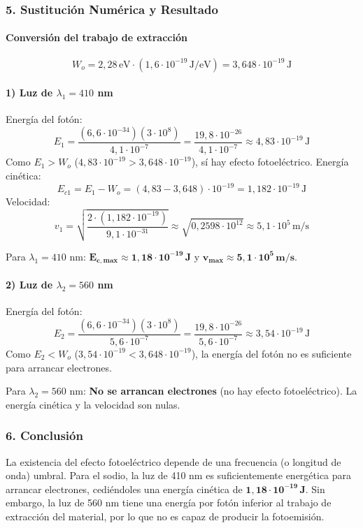 \subsubsection*{5. Sustitución Numérica y Resultado}
\paragraph{Conversión del trabajo de extracción}
$$ W_o = 2,28 \, \text{eV} \cdot (1,6 \cdot 10^{-19} \, \text{J/eV}) = 3,648 \cdot 10^{-19} \, \text{J} $$
\paragraph{1) Luz de $\lambda_1 = 410$ nm}
Energía del fotón:
$$ E_1 = \frac{(6,6 \cdot 10^{-34})(3 \cdot 10^8)}{4,1 \cdot 10^{-7}} = \frac{19,8 \cdot 10^{-26}}{4,1 \cdot 10^{-7}} \approx 4,83 \cdot 10^{-19} \, \text{J} $$
Como $E_1 > W_o$ ($4,83 \cdot 10^{-19} > 3,648 \cdot 10^{-19}$), sí hay efecto fotoeléctrico.
Energía cinética:
$$ E_{c1} = E_1 - W_o = (4,83 - 3,648) \cdot 10^{-19} = 1,182 \cdot 10^{-19} \, \text{J} $$
Velocidad:
$$ v_1 = \sqrt{\frac{2 \cdot (1,182 \cdot 10^{-19})}{9,1 \cdot 10^{-31}}} \approx \sqrt{0,2598 \cdot 10^{12}} \approx 5,1 \cdot 10^5 \, \text{m/s} $$
\begin{cajaresultado}
    Para $\lambda_1=410$ nm: $\boldsymbol{E_{c,max} \approx 1,18 \cdot 10^{-19} \, \textbf{J}}$ y $\boldsymbol{v_{max} \approx 5,1 \cdot 10^5 \, \textbf{m/s}}$.
\end{cajaresultado}

\paragraph{2) Luz de $\lambda_2 = 560$ nm}
Energía del fotón:
$$ E_2 = \frac{(6,6 \cdot 10^{-34})(3 \cdot 10^8)}{5,6 \cdot 10^{-7}} = \frac{19,8 \cdot 10^{-26}}{5,6 \cdot 10^{-7}} \approx 3,54 \cdot 10^{-19} \, \text{J} $$
Como $E_2 < W_o$ ($3,54 \cdot 10^{-19} < 3,648 \cdot 10^{-19}$), la energía del fotón no es suficiente para arrancar electrones.
\begin{cajaresultado}
    Para $\lambda_2=560$ nm: \textbf{No se arrancan electrones} (no hay efecto fotoeléctrico). La energía cinética y la velocidad son nulas.
\end{cajaresultado}

\subsubsection*{6. Conclusión}
\begin{cajaconclusion}
La existencia del efecto fotoeléctrico depende de una frecuencia (o longitud de onda) umbral. Para el sodio, la luz de 410 nm es suficientemente energética para arrancar electrones, cediéndoles una energía cinética de $\mathbf{1,18 \cdot 10^{-19} \, J}$. Sin embargo, la luz de 560 nm tiene una energía por fotón inferior al trabajo de extracción del material, por lo que no es capaz de producir la fotoemisión.
\end{cajaconclusion}

